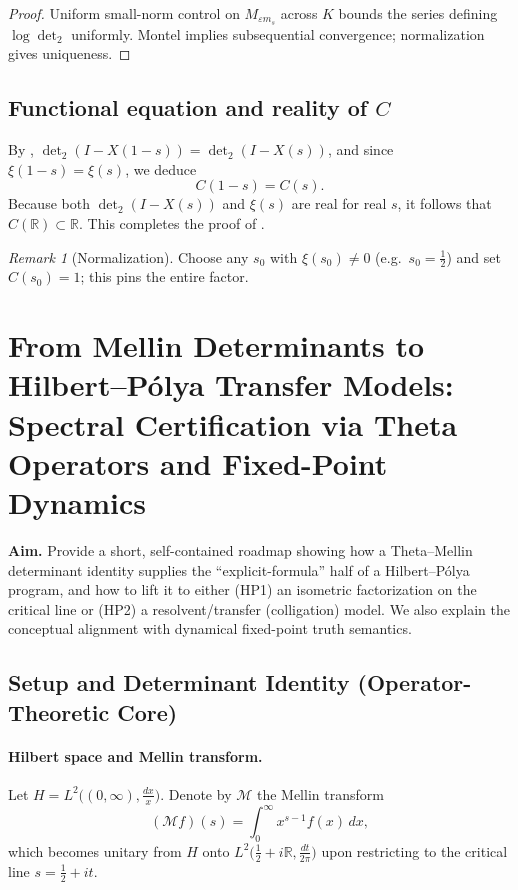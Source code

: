 \documentclass[11pt]{article}
\numberwithin{equation}{section}
\theoremstyle{definition}
\theoremstyle{remark}
\newtheorem{remark}[theorem]{Remark}
\newcommand{\R}{\mathbb{R}}
\newcommand{\eps}{\varepsilon}
\newcommand{\Dettwo}{\operatorname{det}_2}
\newcommand{\1}{\mathbbm{1}}
\begin{document}
\begin{proof}
Uniform small-norm control on \(M_{\eps m_s}\) across \(K\) bounds the series defining \(\log\Dettwo\) uniformly. Montel implies subsequential convergence; normalization gives uniqueness.
\end{proof}

\subsection{Functional equation and reality of \texorpdfstring{$C$}{C}}
By , \(\Dettwo(I-X(1-s))=\Dettwo(I-X(s))\), and since \(\xi(1-s)=\xi(s)\), we deduce
\begin{equation}\label{eq:Cfunctional}
C(1-s)=C(s).
\end{equation}
Because both \(\Dettwo(I-X(s))\) and \(\xi(s)\) are real for real \(s\), it follows that \(C(\R)\subset \R\). This completes the proof of .

\begin{remark}[Normalization]
Choose any \(s_0\) with \(\xi(s_0)\neq0\) (e.g.\ \(s_0=\tfrac12\)) and set \(C(s_0)=1\); this pins the entire factor.
\end{remark}

\section{From Mellin Determinants to Hilbert–Pólya Transfer Models:\\
Spectral Certification via Theta Operators and Fixed-Point Dynamics}
\label{sec:mellin_to_hp}

\noindent\textbf{Aim.}
Provide a short, self-contained roadmap showing how a Theta–Mellin determinant identity supplies the
``explicit-formula'' half of a Hilbert–Pólya program, and how to lift it to either
(HP1) an isometric factorization on the critical line or (HP2) a resolvent/transfer (colligation) model.
We also explain the conceptual alignment with dynamical fixed-point truth semantics.

\subsection{Setup and Determinant Identity (Operator-Theoretic Core)}

\paragraph{Hilbert space and Mellin transform.}
Let \(H=L^2\!\big((0,\infty),\frac{dx}{x}\big)\).
Denote by \(\mathcal{M}\) the Mellin transform
\[
(\mathcal{M}f)(s)=\int_0^\infty x^{s-1}f(x)\,dx,
\]
which becomes unitary from \(H\) onto \(L^2\!\big(\tfrac12+i\mathbb{R},\tfrac{dt}{2\pi}\big)\) upon restricting to the critical line \(s=\tfrac12+it\).
\end{document}
